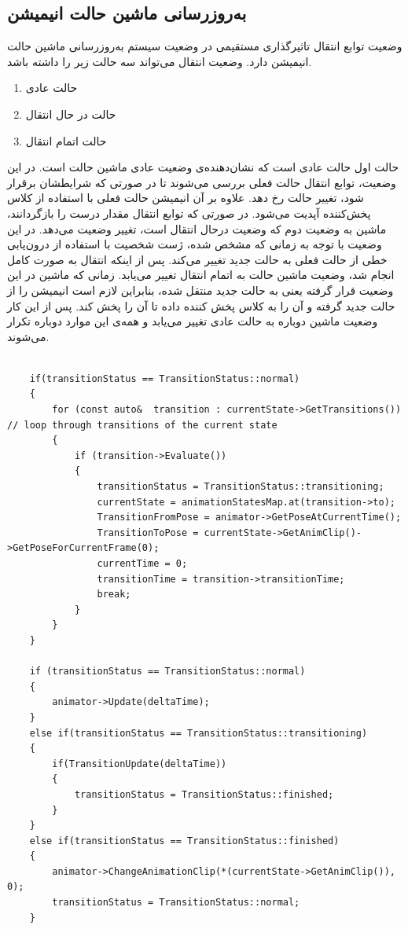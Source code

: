 \subsection{به‌روزرسانی ماشین حالت انیمیشن}

وضعیت توابع انتقال تاثیرگذاری مستقیمی در وضعیت سیستم به‌روزرسانی ماشین حالت انیمیشن دارد.
وضعیت انتقال می‌تواند سه حالت زیر را داشته باشد.

\begin{enumerate}
	\item حالت عادی 
	\item حالت در حال انتقال 
	\item حالت اتمام انتقال 
\end{enumerate}


حالت اول حالت عادی
است که نشان‌دهنده‌ی وضعیت عادی ماشین حالت است. در این وضعیت، توابع انتقال حالت فعلی بررسی می‌شوند تا در صورتی که شرایطشان برقرار شود، تغییر حالت رخ دهد. علاوه بر آن انیمیشن حالت فعلی با استفاده از کلاس پخش‌کننده آپدیت می‌شود.
در صورتی که توابع انتقال مقدار درست
را بازگردانند، ماشین به وضعیت دوم که وضعیت درحال انتقال
است، تغییر وضعیت می‌دهد.
در این وضعیت با توجه به زمانی که مشخص شده، ژست شخصیت با استفاده از درون‌یابی خطی از حالت فعلی به حالت جدید تغییر می‌کند.
پس از اینکه انتقال به صورت کامل انجام شد، وضعیت ماشین حالت به اتمام انتقال
تغییر می‌یابد. زمانی که ماشین‌ در این وضعیت قرار گرفته یعنی به حالت جدید منتقل شده، بنابراین لازم است انیمیشن را از حالت جدید گرفته و آن را به کلاس پخش کننده داده تا آن را پخش کند.
پس از این کار وضعیت ماشین دوباره به حالت عادی تغییر می‌یابد و همه‌ی این موارد دوباره تکرار می‌شوند.

\begin{latin}
	

\begin{lstlisting}

	if(transitionStatus == TransitionStatus::normal) 
	{
		for (const auto&  transition : currentState->GetTransitions()) // loop through transitions of the current state
		{
			if (transition->Evaluate())
			{
				transitionStatus = TransitionStatus::transitioning;
				currentState = animationStatesMap.at(transition->to);
				TransitionFromPose = animator->GetPoseAtCurrentTime();
				TransitionToPose = currentState->GetAnimClip()->GetPoseForCurrentFrame(0);
				currentTime = 0;
				transitionTime = transition->transitionTime;
				break;
			}
		}
	}

	if (transitionStatus == TransitionStatus::normal)
	{
		animator->Update(deltaTime);
	}
	else if(transitionStatus == TransitionStatus::transitioning)
	{
		if(TransitionUpdate(deltaTime)) 
		{
			transitionStatus = TransitionStatus::finished;
		}
	}
	else if(transitionStatus == TransitionStatus::finished)
	{
		animator->ChangeAnimationClip(*(currentState->GetAnimClip()), 0); 
		transitionStatus = TransitionStatus::normal;
	}
\end{lstlisting}

\end{latin}